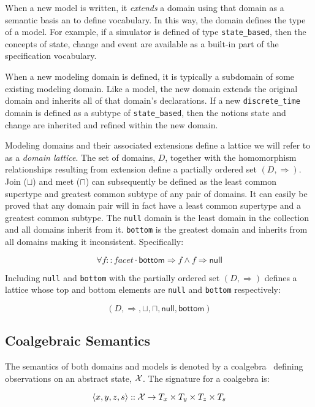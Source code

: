 \documentclass[12pt]{article}
\begin{document}
When a new model is written, it \emph{extends} a domain using that
domain as a semantic basis an to define vocabulary.  In this way, the
domain defines the type of a model.  For example, if a simulator is
defined of type \lstinline!state_based!, then the concepts of state,
change and event are available as a built-in part of the specification
vocabulary.

When a new modeling domain is defined, it is typically a subdomain of
some existing modeling domain.  Like a model, the new domain extends
the original domain and inherits all of that domain's declarations.
If a new \lstinline!discrete_time! domain is defined as a subtype of
\lstinline!state_based!, then the notions state and change are
inherited and refined within the new domain.

Modeling domains and their associated extensions define a lattice we
will refer to as a \emph{domain lattice}.  The set of domains, $D$,
together with the homomorphism relationships resulting from extension
define a partially ordered set $(D,\Rightarrow)$.  Join ($\sqcup$) and
meet ($\sqcap$) can subsequently be defined as the least common
supertype and greatest common subtype of any pair of domains.  It can
easily be proved that any domain pair will in fact have a least common
supertype and a greatest common subtype.  The \lstinline!null! domain
is the least domain in the collection and all domains inherit from it.
\lstinline!bottom! is the greatest domain and inherits from all
domains making it inconsistent.  Specifically:

\[\forall f::facet \cdot \mathsf{bottom} \Rightarrow f \wedge f \Rightarrow \mathsf{null}\]

Including \lstinline!null! and \lstinline!bottom! with the partially
ordered set $(D,\Rightarrow)$ defines a lattice whose top and bottom
elements are \lstinline!null! and \lstinline!bottom! respectively:

\[(D,\Rightarrow,\sqcup,\sqcap,\mathsf{null},\mathsf{bottom})\]

\subsection{Coalgebraic Semantics}

The semantics of both domains and models is denoted by a
coalgebra~\cite{Jacobs:97:A-Tutorial-on-C} defining observations on an
abstract state, $\mathcal X$.  The signature for a coalgebra is:

\[\langle x,y,z,s \rangle::\mathcal X \rightarrow
T_x\times T_y\times T_z\times T_s\]
\end{document}
